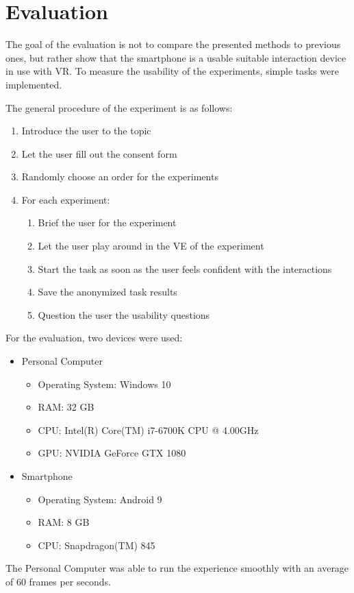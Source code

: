 \chapter{Evaluation}\label{chapter:evaluation}

The goal of the evaluation is not to compare the presented methods to previous ones, but rather show that the smartphone is a usable suitable interaction device in use with \ac{VR}. 
To measure the usability of the experiments, simple tasks were implemented.

The general procedure of the experiment is as follows:
\begin{enumerate}
  \item Introduce the user to the topic
  \item Let the user fill out the consent form
  \item Randomly choose an order for the experiments
  \item For each experiment:
  \begin{enumerate}
  \item Brief the user for the experiment
  \item Let the user play around in the \ac{VE} of the experiment
  \item Start the task as soon as the user feels confident with the interactions
  \item Save the anonymized task results
  \item Question the user the usability questions
  \end{enumerate}
\end{enumerate}

For the evaluation, two devices were used:
\begin{itemize}
  \item Personal Computer
  \begin{itemize}
    \item Operating System: Windows 10
    \item RAM: 32 GB
    \item CPU: Intel(R) Core(TM) i7-6700K CPU @ 4.00GHz %
    \item GPU: NVIDIA GeForce GTX 1080  
  \end{itemize}
  \item Smartphone
  \begin{itemize}
    \item Operating System: Android 9
    \item RAM: 8 GB
    \item CPU: Snapdragon(TM) 845
  \end{itemize}
\end{itemize}

The Personal Computer was able to run the experience smoothly with an average of 60 frames per seconds.